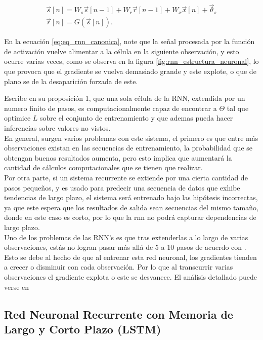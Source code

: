 \documentclass[12pt,letterpaper]{article}
\begin{document}
\begin{gather}
    \label{eq:eq_rnn_canonica}
    \vec{s}[n] = W_s \vec{s}[n-1] + W_r \vec{r}[n-1]+ W_x\vec{x}[n]+\vec{\theta}_s\\
    \vec{r}[n] = G(\vec{s}[n]).
\end{gather}

En la ecuación \ref{eq:eq_rnn_canonica}, note que la señal procesada por la función de activación vuelve alimentar a la célula en la siguiente observación, y esto ocurre varias veces, como se observa en la figura \ref{fig:rnn_estructura_neuronal}, lo que provoca que el gradiente se vuelva demasiado grande y este explote, o que de plano se de la desaparición forzada de este.

\cite{sherstinsky2020fundamentals} Escribe en su proposición 1, que una sola célula de la RNN, extendida por un numero finito de pasos, es computacionalmente capaz de encontrar a $\Theta$ tal que optimice $L$ sobre el conjunto de entrenamiento y que ademas pueda hacer inferencias sobre valores no vistos. \\

En general, surgen varios problemas con este sistema, el primero es que entre más observaciones existan en las secuencias de entrenamiento, la probabilidad que se obtengan buenos resultados aumenta, pero esto implica que aumentará la cantidad de cálculos computacionales que se tienen que realizar.\\

Por otra parte, si un sistema recurrente se extiende por una cierta cantidad de pasos pequeños, y es usado para predecir una secuencia de datos que exhibe tendencias de largo plazo, el sistema será entrenado bajo las hipótesis incorrectas, ya que este espera que los resultados de salida sean secuencias del mismo tamaño, donde en este caso es corto, por lo que la rnn no podrá capturar dependencias de largo plazo. \\

Uno de los problemas de las RNN's es que tras extenderlas a lo largo de varias observaciones, estás no logran pasar más allá de 5 a 10 pasos de acuerdo con \cite{sherstinsky2020fundamentals}. Esto se debe al hecho de que al entrenar esta red neuronal, los gradientes  tienden a crecer o disminuir con cada observación. Por lo que al transcurrir varias observaciones el gradiente explota o este se desvanece. El análisis detallado puede verse en \cite{sherstinsky2020fundamentals}


\subsection{Red Neuronal Recurrente con Memoria de Largo y Corto Plazo (LSTM)}
\end{document}
